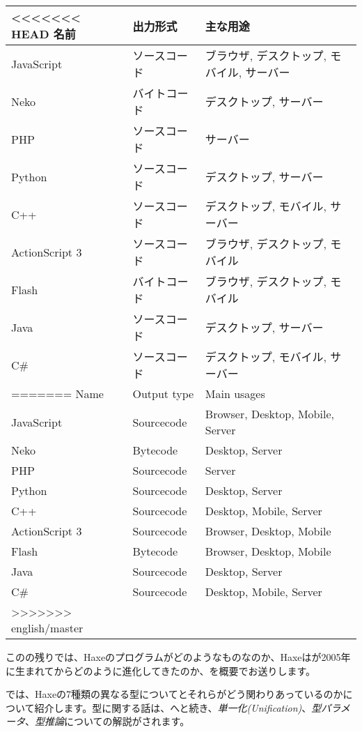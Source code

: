 \begin{center}
\begin{tabular}{| l | l | l |}
	\hline
<<<<<<< HEAD
	名前 & 出力形式 & 主な用途 \\ \hline
	JavaScript & ソースコード & ブラウザ, デスクトップ, モバイル, サーバー \\
	Neko & バイトコード & デスクトップ, サーバー \\
	PHP & ソースコード & サーバー \\
	Python & ソースコード & デスクトップ, サーバー \\
	C++ & ソースコード & デスクトップ, モバイル, サーバー \\
	ActionScript 3 & ソースコード & ブラウザ, デスクトップ, モバイル \\
	Flash & バイトコード & ブラウザ, デスクトップ, モバイル \\ 
	Java & ソースコード & デスクトップ, サーバー \\
	C\# & ソースコード & デスクトップ, モバイル, サーバー \\ \hline
=======
	Name & Output type & Main usages \\ \hline
	JavaScript & Sourcecode & Browser, Desktop, Mobile, Server \\
	Neko & Bytecode & Desktop, Server \\
	PHP & Sourcecode & Server \\
	Python & Sourcecode & Desktop, Server \\
	C++ & Sourcecode & Desktop, Mobile, Server \\
	ActionScript 3 & Sourcecode & Browser, Desktop, Mobile \\
	Flash & Bytecode & Browser, Desktop, Mobile \\ 
	Java & Sourcecode & Desktop, Server \\
	C\# & Sourcecode & Desktop, Mobile, Server \\ \hline
>>>>>>> english/master
\end{tabular}
\end{center}

このの残りでは、Haxeのプログラムがどのようなものなのか、Haxeはが2005年に生まれてからどのように進化してきたのか、を概要でお送りします。

では、Haxeの7種類の異なる型についてとそれらがどう関わりあっているのかについて紹介します。型に関する話は、へと続き、\emph{単一化(Unification)}、\emph{型パラメータ}、\emph{型推論}についての解説がされます。

